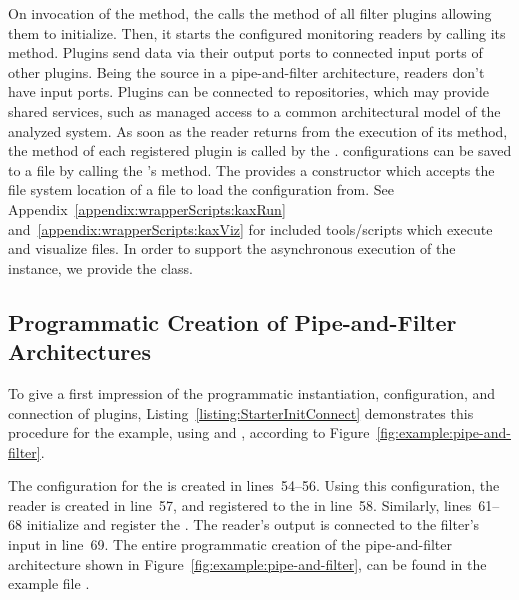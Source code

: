 \noindent On invocation of the  method, the  %
calls the  method of all filter plugins allowing them to initialize. %
Then, it starts the configured monitoring readers by calling its  %
method. Plugins send data via their output ports to connected input ports of other
plugins. Being the source in a pipe-and-filter architecture, readers don't have %
input ports. Plugins can be connected to repositories, which may provide %
shared services, such as managed access to a common architectural model %
of the analyzed system. As soon as the reader returns from the execution of its 
method, the method  of each registered plugin is called by the %
. \KiekerAnalysisPart{} configurations can be saved %
to a  file by calling the 's  method. %
The  provides a constructor which accepts the %
file system location of a  file to load the configuration from. %
See Appendix~\ref{appendix:wrapperScripts:kaxRun} and~\ref{appendix:wrapperScripts:kaxViz} %
for included tools/scripts which execute and visualize  files.
In order to support the asynchronous execution of the  instance, %
we provide the  class.

\subsection{Programmatic Creation of Pipe-and-Filter Architectures}\label{sec:analysis:programmaticCreation}

To give a first impression of the programmatic %
instantiation, configuration, and connection of plugins, Listing~\ref{listing:StarterInitConnect} %
demonstrates this procedure for the example, using  and %
, according to Figure~\ref{fig:example:pipe-and-filter}.

The configuration for the  is created in lines~54--56. %
Using this configuration, the reader is created in line~57, and registered to %
the  in line~58. Similarly, lines~61--68 initialize %
and register the . The reader's output is connected %
to the filter's input in line~69. %
The entire programmatic creation of the pipe-and-filter architecture shown %
in Figure~\ref{fig:example:pipe-and-filter}, can be found in the example  %
file .

